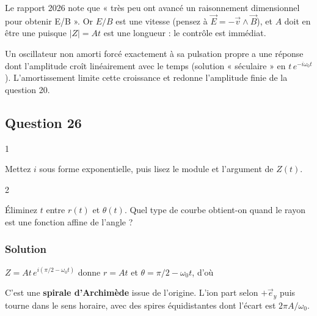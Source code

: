 \documentclass[11pt,a4paper]{article}
\newcommand{\equationajustee}[1]{%
  \sbox{\boiteequation}{$\displaystyle #1$}%
  \ifdim\wd\boiteequation>\linewidth
    \[\resizebox{\linewidth}{!}{\usebox{\boiteequation}}\]%
  \else
    \[#1\]%
  \fi}
\begin{document}
\begin{jury}

Le rapport 2026 note que « très peu ont avancé un raisonnement dimensionnel pour obtenir E/B ». Or \(E/B\) est une vitesse (pensez à \(\vec E=-\vec v\wedge\vec B\)), et \(A\) doit en être une puisque \(|Z|=At\) est une longueur : le contrôle est immédiat.

\end{jury}

\begin{methode}

Un oscillateur non amorti forcé exactement à sa pulsation propre a une réponse dont l'amplitude croît linéairement avec le temps (solution « séculaire » en \(t\,e^{-i\omega_0t}\)). L'amortissement limite cette croissance et redonne l'amplitude finie de la question 20.

\end{methode}

\hypertarget{question-26}{%
\subsection{Question 26}\label{question-26}}

\begin{indication}{1}

Mettez \(i\) sous forme exponentielle, puis lisez le module et l'argument de \(Z(t)\).

\end{indication}

\begin{indication}{2}

Éliminez \(t\) entre \(r(t)\) et \(\theta(t)\). Quel type de courbe obtient-on quand le rayon est une fonction affine de l'angle ?

\end{indication}

\hypertarget{solution-25}{%
\subsubsection{Solution}\label{solution-25}}

\(Z=At\,e^{i(\pi/2-\omega_0t)}\) donne \(r=At\) et \(\theta=\pi/2-\omega_0t\), d'où

\equationajustee{\boxed{r=\frac{E}{2B\omega_0}\Big(\frac\pi2-\theta\Big)}}

C'est une \textbf{spirale d'Archimède} issue de l'origine. L'ion part selon \(+\vec e_y\) puis tourne dans le sens horaire, avec des spires équidistantes dont l'écart est \(2\pi A/\omega_0\).
\end{document}

